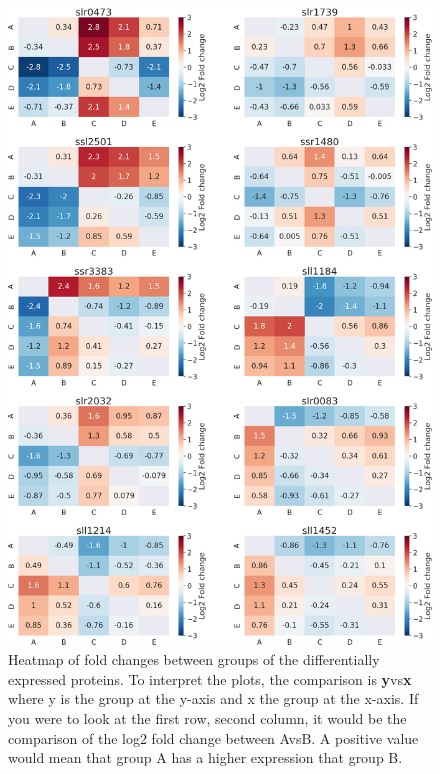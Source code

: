 \begin{figure}[H]
  \includegraphics[width=\linewidth]{results/combined.png}
  \caption{Heatmap of fold changes between groups of the differentially expressed proteins. To interpret the plots, the comparison is \textbf{y}vs\textbf{x} where y is the group at the y-axis and x the group at the x-axis. If you were to look at the first row, second column, it would be the comparison of the log2 fold change between AvsB. A positive value would mean that group A has a higher expression that group B.}
  \label{fig:heatmap}
\end{figure}

